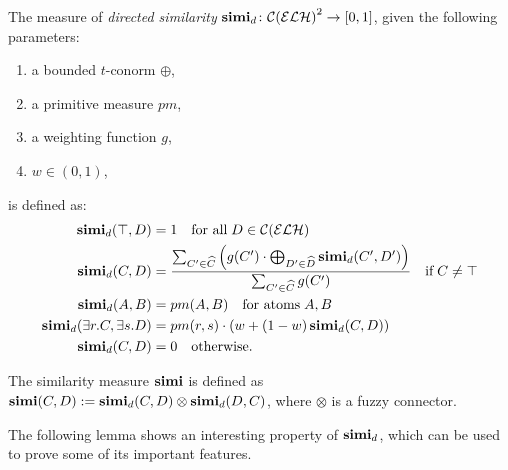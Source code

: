   \begin{definition}[\(\simi_d\)]\label{simi-d}
    The measure of \emph{directed similarity} \(\operatorname{\mathbf{simi}}_d \colon {\mathcal{C}(\mathcal{ELH})}^2 \to [0,1]\), given the following parameters:
    \begin{enumerate}
      \item a bounded \(t\)-conorm \(\oplus\),
      \item a primitive measure \(pm\),
      \item a weighting function \(g\),
      \item \(w \in (0,1)\),
    \end{enumerate}
    is defined as:
    \begin{align}
      \simi_d(\top,D) &= 1 \quad
      \text{for all}\; D \in \mathcal{C}(\mathcal{ELH}) \\
      \simi_d(C,D) &=
      \frac{\sum_{C^\prime \in \widehat{C}}\left(g(C^\prime) \cdot \bigoplus_{D^\prime \in \widehat{D}} \simi_d(C^\prime, D^\prime)\right)}%
      {\sum_{C^\prime \in \widehat{C}}g(C^\prime)} \quad \text{if}\; C \ne \top \label{simi:general}\\
      \simi_d(A,B) &= pm(A,B) \quad \text{for atoms}\; A,B \\
      \simi_d(\exists{}r.C,\exists{}s.D) &=
      pm(r,s) \cdot \left(w + (1-w)\simi_d(C,D)\right) \\
      \simi_d(C,D) &= 0 \quad \text{otherwise}.
    \end{align}
  \end{definition}

  \begin{definition}[\(\simi\)]
    The similarity measure \(\simi\) is defined as \(\operatorname{\mathbf{simi}}(C,D) := \operatorname{\mathbf{simi}}_d(C,D) \otimes \operatorname{\mathbf{simi}}_d(D,C)\), where \(\otimes{}\) is a fuzzy connector.
  \end{definition}

  The following lemma shows an interesting property of \(\simi_d\), which can be used to prove some of its important features.

